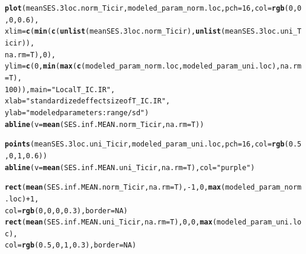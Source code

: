 \documentclass[12pt]{article}\usepackage[]{graphicx}\usepackage[]{color}
\makeatletter
\newcommand{\hlnum}[1]{\textcolor[rgb]{0.686,0.059,0.569}{#1}}%
\newcommand{\hlstr}[1]{\textcolor[rgb]{0.192,0.494,0.8}{#1}}%
\newcommand{\hlopt}[1]{\textcolor[rgb]{0,0,0}{#1}}%
\newcommand{\hlstd}[1]{\textcolor[rgb]{0.345,0.345,0.345}{#1}}%
\newcommand{\hlkwc}[1]{\textcolor[rgb]{0.333,0.667,0.333}{#1}}%
\newcommand{\hlkwd}[1]{\textcolor[rgb]{0.737,0.353,0.396}{\textbf{#1}}}%
\newenvironment{kframe}{%
 \def\at@end@of@kframe{}%
 \ifinner\ifhmode%
  \def\at@end@of@kframe{\end{minipage}}%
  \begin{minipage}{\columnwidth}%
 \fi\fi%
 \def\FrameCommand##1{\hskip\@totalleftmargin \hskip-\fboxsep
 \colorbox{shadecolor}{##1}\hskip-\fboxsep
     \hskip-\linewidth \hskip-\@totalleftmargin \hskip\columnwidth}%
 \MakeFramed {\advance\hsize-\width
   \@totalleftmargin\z@ \linewidth\hsize
   \@setminipage}}%
 {\par\unskip\endMakeFramed%
 \at@end@of@kframe}
\newenvironment{knitrout}{}{} %
\makeatother
\begin{document}
\begin{knitrout}\small
{}\color{fgcolor}\begin{kframe}
\begin{alltt}
\hlkwd{plot}\hlstd{(meanSES.3loc.norm_Ticir, modeled_param_norm.loc,} \hlkwc{pch} \hlstd{=} \hlnum{16}\hlstd{,} \hlkwc{col} \hlstd{=} \hlkwd{rgb}\hlstd{(}\hlnum{0}\hlstd{,} \hlnum{0}\hlstd{,} \hlnum{0}\hlstd{,} \hlnum{0.6}\hlstd{),}
  \hlkwc{xlim} \hlstd{=} \hlkwd{c}\hlstd{(}\hlkwd{min}\hlstd{(}\hlkwd{c}\hlstd{(}\hlkwd{unlist}\hlstd{(meanSES.3loc.norm_Ticir),} \hlkwd{unlist}\hlstd{(meanSES.3loc.uni_Ticir)),}
    \hlkwc{na.rm} \hlstd{= T),} \hlnum{0}\hlstd{),}
    \hlkwc{ylim} \hlstd{=} \hlkwd{c}\hlstd{(}\hlnum{0}\hlstd{,} \hlkwd{min}\hlstd{(}\hlkwd{max}\hlstd{(}\hlkwd{c}\hlstd{(modeled_param_norm.loc, modeled_param_uni.loc),} \hlkwc{na.rm} \hlstd{= T),}
                    \hlnum{100}\hlstd{)),}  \hlkwc{main} \hlstd{=} \hlstr{"Local T_IC.IR"}\hlstd{,}
  \hlkwc{xlab} \hlstd{=} \hlstr{"standardized effect size of T_IC.IR"}\hlstd{,}
  \hlkwc{ylab} \hlstd{=} \hlstr{"modeled parameters: range/sd"}\hlstd{)}
\hlkwd{abline}\hlstd{(}\hlkwc{v} \hlstd{=} \hlkwd{mean}\hlstd{(SES.inf.MEAN.norm_Ticir,} \hlkwc{na.rm} \hlstd{= T))}

\hlkwd{points}\hlstd{(meanSES.3loc.uni_Ticir, modeled_param_uni.loc,} \hlkwc{pch} \hlstd{=} \hlnum{16}\hlstd{,} \hlkwc{col} \hlstd{=} \hlkwd{rgb}\hlstd{(}\hlnum{0.5}\hlstd{,} \hlnum{0}\hlstd{,} \hlnum{1}\hlstd{,} \hlnum{0.6}\hlstd{))}
\hlkwd{abline}\hlstd{(}\hlkwc{v} \hlstd{=} \hlkwd{mean}\hlstd{(SES.inf.MEAN.uni_Ticir,} \hlkwc{na.rm} \hlstd{= T),} \hlkwc{col} \hlstd{=} \hlstr{"purple"}\hlstd{)}

\hlkwd{rect}\hlstd{(}\hlkwd{mean}\hlstd{(SES.inf.MEAN.norm_Ticir,} \hlkwc{na.rm} \hlstd{= T),} \hlopt{-}\hlnum{1}\hlstd{,} \hlnum{0}\hlstd{,} \hlkwd{max}\hlstd{(modeled_param_norm.loc)} \hlopt{+} \hlnum{1}\hlstd{,}
     \hlkwc{col} \hlstd{=} \hlkwd{rgb}\hlstd{(}\hlnum{0}\hlstd{,} \hlnum{0}\hlstd{,} \hlnum{0}\hlstd{,} \hlnum{0.3}\hlstd{),} \hlkwc{border} \hlstd{=} \hlnum{NA}\hlstd{)}
\hlkwd{rect}\hlstd{(}\hlkwd{mean}\hlstd{(SES.inf.MEAN.uni_Ticir,} \hlkwc{na.rm} \hlstd{= T),}\hlnum{0}\hlstd{,} \hlnum{0}\hlstd{,} \hlkwd{max}\hlstd{(modeled_param_uni.loc),}
     \hlkwc{col} \hlstd{=} \hlkwd{rgb}\hlstd{(}\hlnum{0.5}\hlstd{,} \hlnum{0}\hlstd{,} \hlnum{1}\hlstd{,} \hlnum{0.3}\hlstd{),} \hlkwc{border} \hlstd{=} \hlnum{NA}\hlstd{)}
\end{alltt}
\end{kframe}\begin{figure}


\end{figure}
\end{knitrout}
\end{document}
